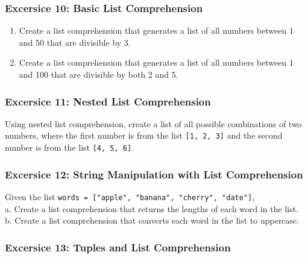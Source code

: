 \documentclass[
  letterpaper,
  DIV=11,
  numbers=noendperiod]{scrreprt}
\providecommand{\tightlist}{%
  \setlength{\itemsep}{0pt}\setlength{\parskip}{0pt}}\usepackage{longtable,booktabs,array}
\begin{document}
\hypertarget{excersice-10-basic-list-comprehension}{%
\subsubsection{Excersice 10: Basic List
Comprehension}\label{excersice-10-basic-list-comprehension}}

\begin{enumerate}
\def\labelenumi{\alph{enumi}.}
\tightlist
\item
  Create a list comprehension that generates a list of all numbers
  between 1 and 50 that are divisible by 3.\\
\item
  Create a list comprehension that generates a list of all numbers
  between 1 and 100 that are divisible by both 2 and 5.
\end{enumerate}

\hypertarget{excersice-11-nested-list-comprehension}{%
\subsubsection{Excersice 11: Nested List
Comprehension}\label{excersice-11-nested-list-comprehension}}

Using nested list comprehension, create a list of all possible
combinations of two numbers, where the first number is from the list
\texttt{{[}1,\ 2,\ 3{]}} and the second number is from the list
\texttt{{[}4,\ 5,\ 6{]}}.

\hypertarget{excersice-12-string-manipulation-with-list-comprehension}{%
\subsubsection{Excersice 12: String Manipulation with List
Comprehension}\label{excersice-12-string-manipulation-with-list-comprehension}}

Given the list
\texttt{words\ =\ {[}"apple",\ "banana",\ "cherry",\ "date"{]}},\\
a. Create a list comprehension that returns the lengths of each word in
the list.\\
b. Create a list comprehension that converts each word in the list to
uppercase.

\hypertarget{excersice-13-tuples-and-list-comprehension}{%
\subsubsection{Excersice 13: Tuples and List
Comprehension}\label{excersice-13-tuples-and-list-comprehension}}
\end{document}
